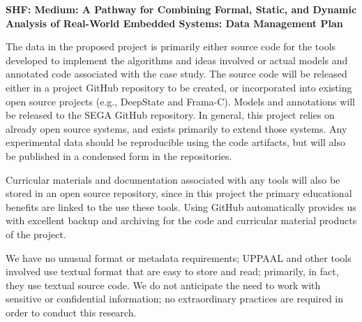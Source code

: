 \documentclass{article}
\begin{document}
\begin{center}
{\Large\sf\textbf{SHF: Medium: A Pathway for Combining Formal, Static,
    and Dynamic Analysis of Real-World Embedded Systems: Data Management Plan}}
\end{center}

The data in the proposed project is primarily either source code for
the tools developed to implement the algorithms and ideas involved or
actual models and annotated code associated with the case study.  The source code will be released either in a project GitHub repository to be created, or incorporated into existing open source projects (e.g., DeepState and Frama-C).  Models and annotations will be released to the SEGA GitHub repository.  In general, this project relies on already open source systems, and exists primarily to extend those systems.  Any experimental data should be reproducible using the code artifacts, but will also be published in a condensed form in the repositories.

Curricular
materials and documentation associated with any tools will also be stored in
an open source repository, since in this project the primary
educational benefits are linked to the use these tools.  Using GitHub automatically provides us with excellent backup
and archiving for the code and curricular material products of the
project.

We have no unusual format or metadata requirements; UPPAAL and other
tools involved use textual format that are easy to store and read;
primarily, in fact, they use textual source code.
We do not anticipate the need to work with sensitive or confidential
information; no extraordinary practices are required in order to
conduct this research.
\end{document}
